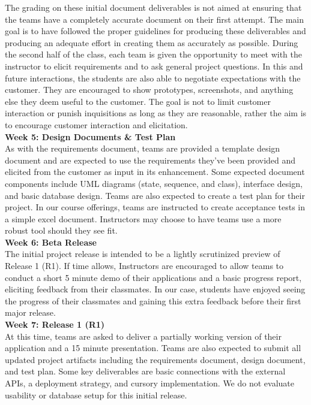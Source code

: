 \documentclass[conference]{IEEEtran}
\begin{document}
The grading on these initial document deliverables is not aimed at ensuring that the teams have a completely accurate document on their first attempt. The main goal is to have followed the proper guidelines for producing these deliverables and producing an adequate effort in creating them as accurately as possible. During the second half of the class, each team is given the opportunity to meet with the instructor to elicit requirements and to ask general project questions. In this and future interactions, the students are also able to negotiate expectations with the customer. They are encouraged to show prototypes, screenshots, and anything else they deem useful to the customer. The goal is not to limit customer interaction or punish inquisitions as long as they are reasonable, rather the aim is to encourage customer interaction and elicitation.\\

\textbf{Week 5: Design Documents \& Test Plan}\\
As with the requirements document, teams are provided a template design document and are expected to use the requirements they've been provided and elicited from the customer as input in its enhancement. Some expected document components include UML diagrams (state, sequence, and class), interface design, and basic database design. Teams are also expected to create a test plan for their project. In our course offerings, teams are instructed to create acceptance tests in a simple excel document. Instructors may choose to have teams use a more robust tool should they see fit. \\

\textbf{Week 6: Beta Release}\\
The initial project release is intended to be a lightly scrutinized preview of Release 1 (R1). If time allows, Instructors are encouraged to allow teams to conduct a short 5 minute demo of their applications and a basic progress report, eliciting feedback from their classmates. In our case, students have enjoyed seeing the progress of their classmates and gaining this extra feedback before their first major release.\\

\textbf{Week 7: Release 1 (R1)}\\
At this time, teams are asked to deliver a partially working version of their application and a 15 minute presentation. Teams are also expected to submit all updated project artifacts including the requirements document, design document, and test plan. Some key deliverables are basic connections with the external APIs, a deployment strategy, and cursory implementation. We do not evaluate usability or database setup for this initial release.
\end{document}
